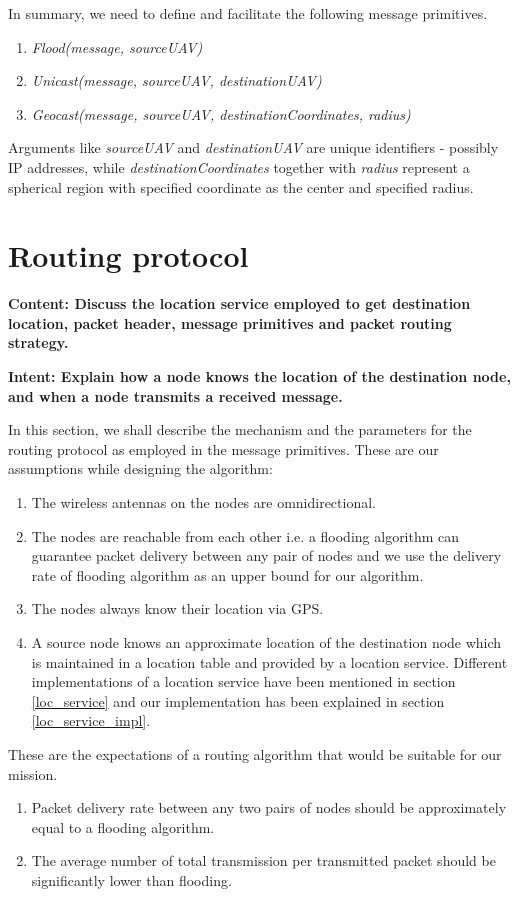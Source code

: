 In summary, we need to define and facilitate the following message primitives.
\begin{enumerate}
\item \emph{Flood(message, sourceUAV)}
\item \emph{Unicast(message, sourceUAV, destinationUAV)}
\item \emph{Geocast(message, sourceUAV, destinationCoordinates, radius)}
\end{enumerate}
Arguments like \emph{sourceUAV} and \emph{destinationUAV} are unique identifiers - possibly IP addresses, while \emph{destinationCoordinates} together with \emph{radius} represent a spherical region with specified coordinate as the center and specified radius.

\section{Routing protocol}

\textbf{Content: Discuss the location service employed to get destination location, packet header, message primitives and packet routing strategy.}

\textbf{Intent: Explain how a node knows the location of the destination node, and when a node transmits a received message.
}

In this section, we shall describe the mechanism and the parameters for the routing protocol as employed in the message primitives. 
These are our assumptions while designing the algorithm: 
\begin{enumerate}
\item The wireless antennas on the nodes are omnidirectional.
\item The nodes are reachable from each other i.e. a flooding algorithm can guarantee packet delivery between any pair of nodes and we use the delivery rate of flooding algorithm as an upper bound for our algorithm.
\item The nodes always know their location via GPS. 
\item A source node knows an approximate location of the destination node which is maintained in a location table and provided by a location service. Different implementations of a location service have been mentioned in section \ref{loc_service} and our implementation has been explained in section \ref{loc_service_impl}. 
\end{enumerate}

These are the expectations of a routing algorithm that would be suitable for our mission. 
\begin{enumerate}
\item Packet delivery rate between any two pairs of nodes should be approximately equal to a flooding algorithm. 
\item The average number of total transmission per transmitted packet should be significantly lower than flooding.
\end{enumerate}

